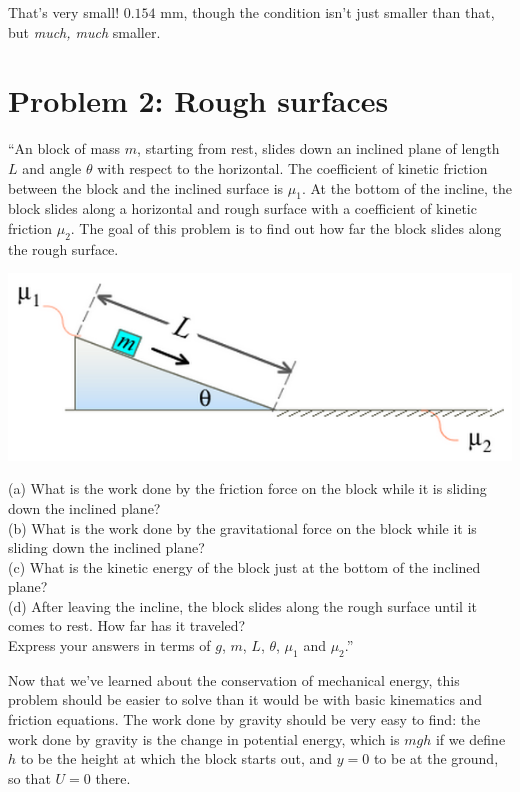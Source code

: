 \documentclass[8.01x]{subfiles}
\begin{document}
That's very small! $0.154$ mm, though the condition isn't just smaller than that, but \emph{much, much} smaller.

\section{Problem 2: Rough surfaces}

``An block of mass $m$, starting from rest, slides down an inclined plane of length $L$ and angle $\theta$ with respect to the horizontal. The coefficient of kinetic friction between the block and the inclined surface is $\mu_1$. At the bottom of the incline, the block slides along a horizontal and rough surface with a coefficient of kinetic friction $\mu_2$. The goal of this problem is to find out how far the block slides along the rough surface.

\begin{center}
\includegraphics[scale=0.7]{Graphics/h4p2}
\end{center}

(a) What is the work done by the friction force on the block while it is sliding down the inclined plane?\\
(b) What is the work done by the gravitational force on the block while it is sliding down the inclined plane?\\
(c) What is the kinetic energy of the block just at the bottom of the inclined plane?\\
(d) After leaving the incline, the block slides along the rough surface until it comes to rest. How far has it traveled?\\
Express your answers in terms of $g$, $m$, $L$, $\theta$, $\mu_1$ and $\mu_2$.''

Now that we've learned about the conservation of mechanical energy, this problem should be easier to solve than it would be with basic kinematics and friction equations. The work done by gravity should be very easy to find: the work done by gravity is the change in potential energy, which is $m g h$ if we define $h$ to be the height at which the block starts out, and $y = 0$ to be at the ground, so that $U = 0$ there.
\end{document}

